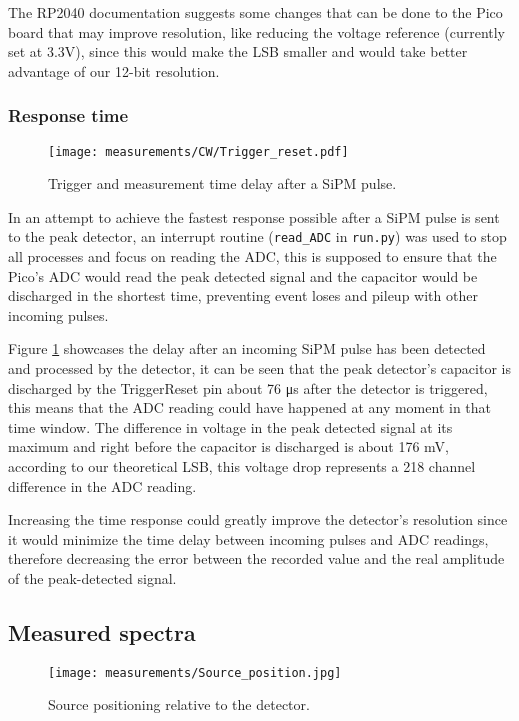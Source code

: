 The RP2040 documentation \cite{datasheet2024rp2040} suggests some changes that can be done to the Pico board that may improve resolution, like reducing the voltage reference (currently set at 3.3V), since this would make the LSB smaller and would take better advantage of our 12-bit resolution.

\subsubsection{Response time}

\begin{figure}[H]
  \centering
  \texttt{[image: measurements/CW/Trigger\_reset.pdf]}
  \caption{\label{fig:measurement_speed}Trigger and measurement time delay after a SiPM pulse.}
\end{figure}

In an attempt to achieve the fastest response possible after a SiPM pulse is sent to the peak detector, an interrupt routine (\texttt{read\_ADC} in \texttt{run.py}) was used to stop all processes and focus on reading the ADC, this is supposed to ensure that the Pico's ADC would read the peak detected signal and the capacitor would be discharged in the shortest time, preventing event loses and pileup with other incoming pulses. 

Figure \ref{fig:measurement_speed} showcases the delay after an incoming SiPM pulse has been detected and processed by the detector, it can be seen that the peak detector's capacitor is discharged by the TriggerReset pin about 76 \unit{\micro\s} after the detector is triggered, this means that the ADC reading could have happened at any moment in that time window. The difference in voltage in the peak detected signal at its maximum and right before the capacitor is discharged is about 176 \unit{\mV}, according to our theoretical LSB, this voltage drop represents a 218 channel difference in the ADC reading.

Increasing the time response could greatly improve the detector's resolution since it would minimize the time delay between incoming pulses and ADC readings, therefore decreasing the error between the recorded value and the real amplitude of the peak-detected signal.

\subsection{Measured spectra}

\begin{figure}[H]
  \centering
  \texttt{[image: measurements/Source\_position.jpg]}
  \caption{\label{fig:source_position}Source positioning relative to the detector.}
\end{figure}


